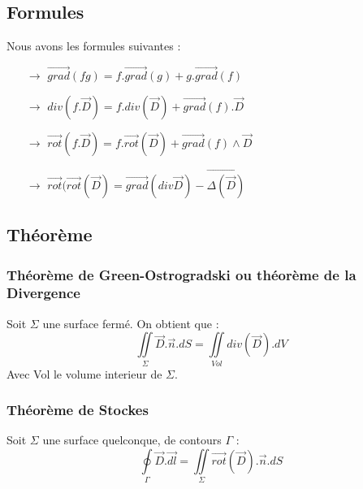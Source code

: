 \subsection{Formules}
Nous avons les formules suivantes : \\
\begin{itemize}
 \item[$\rightarrow$] $\overrightarrow{grad}(fg) = f.\overrightarrow{grad}(g) + g.\overrightarrow{grad}(f)$\\
 \item[$\rightarrow$] $div(f.\overrightarrow{D}) = f.div(\overrightarrow{D})+\overrightarrow{grad}(f).\overrightarrow{D}$\\
 \item[$\rightarrow$] $\overrightarrow{rot}(f.\overrightarrow{D}) = f.\overrightarrow{rot}(\overrightarrow{D}) + \overrightarrow{grad}(f)\wedge\overrightarrow{D}$\\
 \item[$\rightarrow$] $\overrightarrow{rot}(\overrightarrow{rot}(\overrightarrow{D}) = \overrightarrow{grad}(div \overrightarrow{D}) - \overrightarrow{\Delta(\overrightarrow{D})}$\\
\end{itemize}
\subsection{Théorème}
\subsubsection{Théorème de Green-Ostrogradski ou théorème de la Divergence}
Soit $\Sigma$ une surface fermé. On obtient que : 
$$\underset{\Sigma}\iint \overrightarrow{D}.\overrightarrow{n}.dS = \underset{Vol}\iint div(\overrightarrow{D}).dV$$
Avec Vol le volume interieur de $\Sigma$.
\subsubsection{Théorème de Stockes}
Soit $\Sigma$ une surface quelconque, de contours $\Gamma$ :
$$\underset{\Gamma}\oint \overrightarrow{D}.\overrightarrow{dl} = \underset{\Sigma}\iint \overrightarrow{rot}(\overrightarrow{D}).\overrightarrow{n}.dS$$










